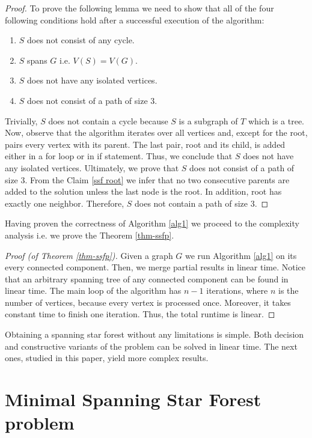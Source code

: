 \documentclass[en]{pracamgr}
\newcommand{\ssf}{spanning star forest}
\begin{document}
\begin{proof}
	To prove the following lemma we need to show that all of the four following conditions hold after a successful execution of the algorithm:
	\begin{enumerate}
		\item $S$ does not consist of any cycle.
		\item $S$ spans $G$ i.e. $V(S) = V(G)$.
		\item $S$ does not have any isolated vertices.
		\item $S$ does not consist of a path of size $3$.
	\end{enumerate}
	Trivially, $S$ does not contain a cycle because $S$ is a subgraph of $T$ which is a tree. Now, observe that the algorithm iterates over all vertices and, except for the root, pairs every vertex with its parent. The last pair, root and its child, is added either in a for loop or in if statement. Thus, we conclude that $S$ does not have any isolated vertices. Ultimately, we prove that $S$ does not consist of a path of size $3$. From the Claim \ref{ssf root} we infer that no two consecutive parents are added to the solution unless the last node is the root. In addition, root has exactly one neighbor. Therefore, $S$ does not contain a path of size $3$.
\end{proof}

Having proven the correctness of Algorithm \ref{alg1} we proceed to the complexity analysis i.e. we prove the Theorem \ref{thm-ssfp}.

\begin{proof}[Proof (of Theorem \ref{thm-ssfp})]
	Given a graph $G$ we run Algorithm \ref{alg1} on its every connected component. Then, we  merge partial results in linear time. Notice that an arbitrary spanning tree of any connected component can be found in linear time. The main loop of the algorithm has $n-1$ iterations, where $n$ is the number of vertices, because every vertex is processed once. Moreover, it takes constant time to finish one iteration. Thus, the total runtime is linear.
\end{proof}

Obtaining a \ssf{} without any limitations is simple. Both decision and constructive variants of the problem can be solved in linear time. The next ones, studied in this paper, yield more complex results.

\chapter{Minimal Spanning Star Forest problem}
\end{document}
